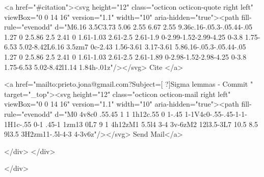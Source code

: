       <a  href="#citation"><svg height="12" class="octicon octicon-quote right left" viewBox="0 0 14 16" version="1.1" width="10" aria-hidden="true"><path fill-rule="evenodd" d="M6.16 3.5C3.73 5.06 2.55 6.67 2.55 9.36c.16-.05.3-.05.44-.05 1.27 0 2.5.86 2.5 2.41 0 1.61-1.03 2.61-2.5 2.61-1.9 0-2.99-1.52-2.99-4.25 0-3.8 1.75-6.53 5.02-8.42L6.16 3.5zm7 0c-2.43 1.56-3.61 3.17-3.61 5.86.16-.05.3-.05.44-.05 1.27 0 2.5.86 2.5 2.41 0 1.61-1.03 2.61-2.5 2.61-1.89 0-2.98-1.52-2.98-4.25 0-3.8 1.75-6.53 5.02-8.42l1.14 1.84h-.01z"/></svg> Cite
      </a>

      <a href="mailto:prieto.jona@gmail.com?Subject=[ ?]Sigma lemmas - Commit " target="_top"><svg height="12" class="octicon octicon-mail right left" viewBox="0 0 14 16" version="1.1" width="10" aria-hidden="true"><path fill-rule="evenodd" d="M0 4v8c0 .55.45 1 1 1h12c.55 0 1-.45 1-1V4c0-.55-.45-1-1-1H1c-.55 0-1 .45-1 1zm13 0L7 9 1 4h12zM1 5.5l4 3-4 3v-6zM2 12l3.5-3L7 10.5 8.5 9l3.5 3H2zm11-.5l-4-3 4-3v6z"/></svg> Send Mail</a>

    </div>
  </div>

</div>




